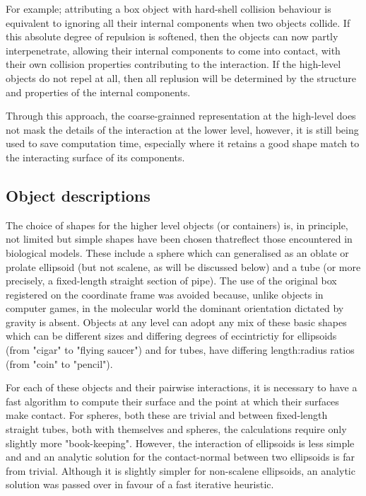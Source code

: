 For example; attributing a box object with hard-shell collision behaviour is equivalent to
ignoring all their internal components when two objects collide.    If this absolute
degree of repulsion is softened, then the objects can now partly interpenetrate,
allowing their internal components to come into contact, with their own collision
properties contributing to the interaction.   If the high-level objects do not
repel at all, then all replusion will be determined by the structure and properties of
the internal components.

Through this approach, the coarse-grainned representation at the high-level does not
mask the details of the interaction at the lower level, however, it is still being
used to save computation time, especially where it retains a good shape match to the
interacting surface of its components.

\subsection{Object descriptions}
 
The choice of shapes for the higher level objects (or containers) is, in principle,
not limited but simple shapes have been chosen thatreflect those encountered in 
biological models.   These include a sphere which can generalised as an oblate or
prolate ellipsoid (but not scalene, as will be discussed below) and a tube (or more
precisely, a fixed-length straight section of pipe).   The use of the original box
registered on the coordinate frame was avoided because, unlike objects in computer
games, in the molecular world the dominant orientation dictated by gravity is absent. 
Objects at any level can adopt any mix of these basic shapes which can be different 
sizes and differing degrees of eccintrictiy for ellipsoids (from "cigar" to "flying 
saucer") and for tubes, have differing length:radius ratios (from "coin" to "pencil").

For each of these objects and their pairwise interactions, it is necessary to have 
a fast algorithm to compute their surface and the point at which their surfaces
make contact.   For spheres, both these are trivial and between fixed-length straight
tubes, both with themselves and spheres, the calculations require only slightly more
"book-keeping".    However, the interaction of ellipsoids is less simple and and 
an analytic solution for the contact-normal between two ellipsoids is far from
trivial.    Although it is slightly simpler for non-scalene ellipsoids, an analytic
solution was passed over in favour of a fast iterative heuristic.  

